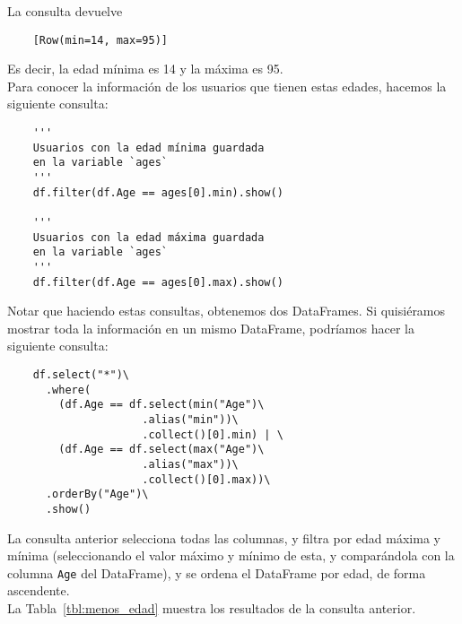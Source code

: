 \documentclass[12pt,a4paper,twoside,openright,titlepage,final]{article}
\begin{document}
\begin{enumerate}
	La consulta devuelve 
	
	\begin{verbatim}
	[Row(min=14, max=95)]
	\end{verbatim}
	
	Es decir, la edad mínima es 14 y la máxima es 95.\\
	
	Para conocer la información de los usuarios que tienen estas edades, hacemos la siguiente consulta:
	
	\begin{verbatim}
	''' 
	Usuarios con la edad mínima guardada 
	en la variable `ages` 
	'''
	df.filter(df.Age == ages[0].min).show()
	
	''' 
	Usuarios con la edad máxima guardada 
	en la variable `ages` 
	'''
	df.filter(df.Age == ages[0].max).show()
	\end{verbatim}
	
	Notar que haciendo estas consultas, obtenemos dos DataFrames. Si quisiéramos mostrar toda la información en un mismo DataFrame, podríamos hacer la siguiente consulta:
	
	\begin{verbatim}
	df.select("*")\
	  .where(
	    (df.Age == df.select(min("Age")\
	                 .alias("min"))\
	                 .collect()[0].min) | \ 
	    (df.Age == df.select(max("Age")\
	                 .alias("max"))\
	                 .collect()[0].max))\
	  .orderBy("Age")\
	  .show()
	\end{verbatim}
	
	La consulta anterior selecciona todas las columnas, y filtra por edad máxima y mínima (seleccionando el valor máximo y mínimo de esta, y comparándola con la columna \texttt{Age} del DataFrame), y se ordena el DataFrame por edad, de forma ascendente.\\
	
	 La Tabla~\ref{tbl:menos_edad} muestra los resultados de la consulta anterior.\\  
\end{enumerate}
\end{document}
